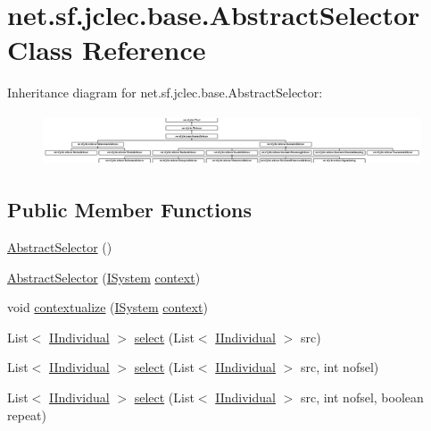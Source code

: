 \hypertarget{classnet_1_1sf_1_1jclec_1_1base_1_1_abstract_selector}{\section{net.\-sf.\-jclec.\-base.\-Abstract\-Selector Class Reference}
\label{classnet_1_1sf_1_1jclec_1_1base_1_1_abstract_selector}
}
Inheritance diagram for net.\-sf.\-jclec.\-base.\-Abstract\-Selector\-:\begin{figure}[H]
\begin{center}
\leavevmode
\includegraphics[height=1.543408cm]{classnet_1_1sf_1_1jclec_1_1base_1_1_abstract_selector}
\end{center}
\end{figure}
\subsection*{Public Member Functions}
\begin{DoxyCompactItemize}
\item 
\hyperlink{classnet_1_1sf_1_1jclec_1_1base_1_1_abstract_selector_af6ff5b38a9659ca10544079baa7acd90}{Abstract\-Selector} ()
\item 
\hyperlink{classnet_1_1sf_1_1jclec_1_1base_1_1_abstract_selector_a775ba98ec610490a02e1dedf7d04bace}{Abstract\-Selector} (\hyperlink{interfacenet_1_1sf_1_1jclec_1_1_i_system}{I\-System} \hyperlink{classnet_1_1sf_1_1jclec_1_1base_1_1_abstract_selector_a4304fe5c27aa7631dc91678d22473b94}{context})
\item 
void \hyperlink{classnet_1_1sf_1_1jclec_1_1base_1_1_abstract_selector_a58922faccb1ed92b428192814f72f573}{contextualize} (\hyperlink{interfacenet_1_1sf_1_1jclec_1_1_i_system}{I\-System} \hyperlink{classnet_1_1sf_1_1jclec_1_1base_1_1_abstract_selector_a4304fe5c27aa7631dc91678d22473b94}{context})
\item 
List$<$ \hyperlink{interfacenet_1_1sf_1_1jclec_1_1_i_individual}{I\-Individual} $>$ \hyperlink{classnet_1_1sf_1_1jclec_1_1base_1_1_abstract_selector_a1458859cb6d679871bee23ea7fc498cd}{select} (List$<$ \hyperlink{interfacenet_1_1sf_1_1jclec_1_1_i_individual}{I\-Individual} $>$ src)
\item 
List$<$ \hyperlink{interfacenet_1_1sf_1_1jclec_1_1_i_individual}{I\-Individual} $>$ \hyperlink{classnet_1_1sf_1_1jclec_1_1base_1_1_abstract_selector_a331626c701ad91e9fb39688485e69828}{select} (List$<$ \hyperlink{interfacenet_1_1sf_1_1jclec_1_1_i_individual}{I\-Individual} $>$ src, int nofsel)
\item 
List$<$ \hyperlink{interfacenet_1_1sf_1_1jclec_1_1_i_individual}{I\-Individual} $>$ \hyperlink{classnet_1_1sf_1_1jclec_1_1base_1_1_abstract_selector_abc984de4221a638e48ead2e0c0bc3a08}{select} (List$<$ \hyperlink{interfacenet_1_1sf_1_1jclec_1_1_i_individual}{I\-Individual} $>$ src, int nofsel, boolean repeat)
\end{DoxyCompactItemize}
